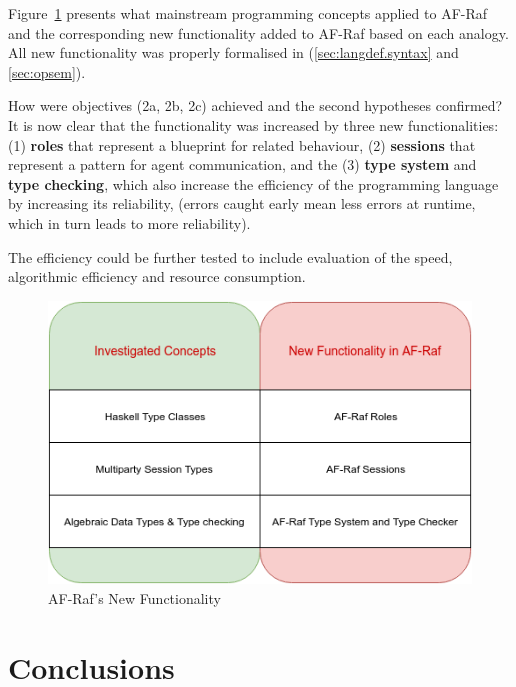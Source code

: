 \documentclass[a4paper,12pt,oneside,fleqn]{book} %
\newcommand{\todo}[1]{[\textcolor{red}{TODO}: #1]}
\begin{document}
Figure~\ref{fig:newFunct} presents what mainstream programming concepts
applied to AF-Raf and the corresponding new functionality added to AF-Raf
based on each analogy. All new functionality was properly formalised in
(\autoref{sec:langdef.syntax} and \autoref{sec:opsem}).

How were objectives (2a, 2b, 2c) achieved and the second hypotheses
confirmed? It is now clear that the functionality was increased by three
new functionalities: (1) \textbf{roles} that represent a blueprint for
related behaviour, (2) \textbf{sessions} that represent a pattern for agent
communication, and the (3) \textbf{type system} and \textbf{type checking},
which also increase the efficiency of the programming language by
increasing its reliability, (errors caught early mean less errors at
runtime, which in turn leads to more reliability).

The efficiency could be further tested to include evaluation of the speed,
algorithmic efficiency and resource consumption.

\begin{figure}\footnotesize %
\includegraphics{NewFunctionality.png}
\caption{AF-Raf's New Functionality}
\label{fig:newFunct}
\end{figure} %



\chapter{Conclusions}\label{ch:conc} %

\end{document}
